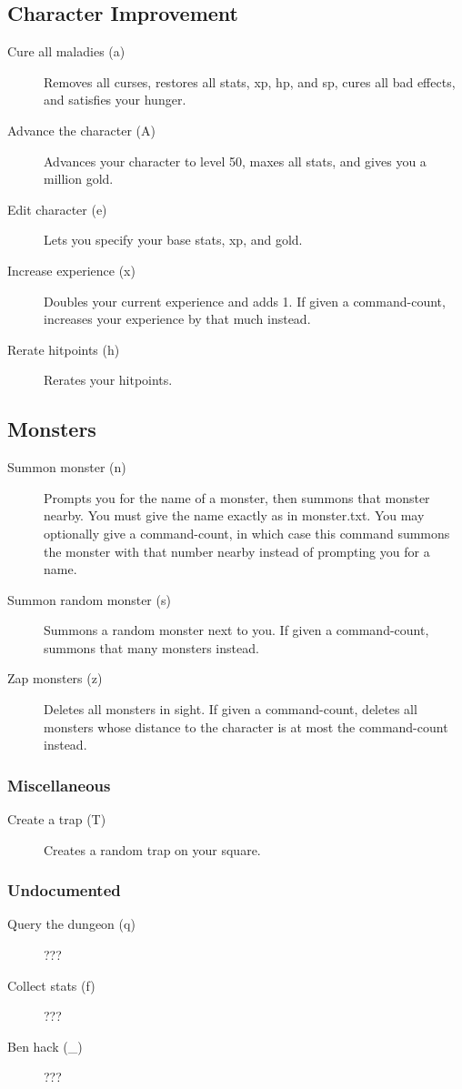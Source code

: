 \subsection{Character Improvement}
\begin{description}
\item[Cure all maladies (a)]
    Removes all curses, restores all stats, xp, hp, and sp, cures
    all bad effects, and satisfies your hunger.
\item[Advance the character (A)]
    Advances your character to level 50, maxes all stats, and gives you
a million gold.
\item[Edit character (e)]
    Lets you specify your base stats, xp, and gold.
\item[Increase experience (x)]
    Doubles your current experience and adds 1. If given a command-count,
increases your experience by that much instead.

\item[Rerate hitpoints (h)]
    Rerates your hitpoints.
\end{description}

\subsection{Monsters}
\begin{description}
\item[Summon monster (n)]
    Prompts you for the name of a monster, then summons that monster
    nearby. You must give the name exactly as in monster.txt. You may
    optionally give a command-count, in which case this command summons the
    monster with that number nearby instead of prompting you for a name.

\item[Summon random monster (s)]
    Summons a random monster next to you. If given a command-count,
    summons that many monsters instead.

\item[Zap monsters (z)]
    Deletes all monsters in sight. If given a command-count, deletes all
monsters whose distance to the character is at most the command-count
instead.
\end{description}

\subsubsection{Miscellaneous}
\begin{description}
\item[Create a trap (T)]
Creates a random trap on your square.
\end{description}

\subsubsection{Undocumented}
\begin{description}
\item[Query the dungeon (q)]
???

\item[Collect stats (f)]
???

\item[Ben hack (\_)]
    ???
\end{description}
